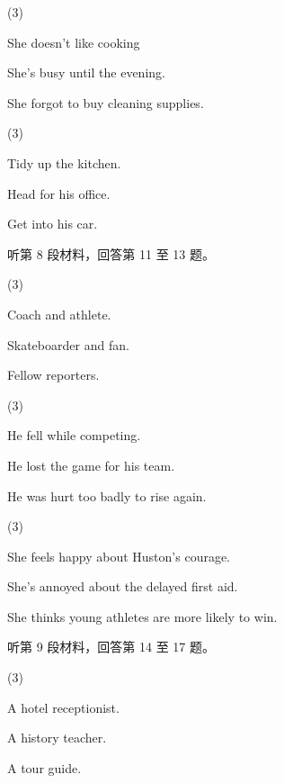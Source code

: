 \documentclass{英语试卷}
\begin{document}
\begin{choices}(3)
  \item She doesn't like cooking
  \item She's busy until the evening.
  \item She forgot to buy cleaning supplies.
\end{choices}
\begin{choices}(3)
  \item Tidy up the kitchen.
  \item Head for his office.
  \item Get into his car.
\end{choices}
\par 听第 8 段材料，回答第 11 至 13 题。\par
{}
\begin{choices}(3)
  \item Coach and athlete.
  \item Skateboarder and fan.
  \item Fellow reporters.
\end{choices}
\begin{choices}(3)
  \item He fell while competing.
  \item He lost the game for his team.
  \item He was hurt too badly to rise again.
\end{choices}
\begin{choices}(3)
  \item She feels happy about Huston's courage.
  \item She's annoyed about the delayed first aid.
  \item She thinks young athletes are more likely to win.
\end{choices}
\par 听第 9 段材料，回答第 14 至 17 题。\par
{}
\begin{choices}(3)
  \item A hotel receptionist.
  \item A history teacher.
  \item A tour guide.
\end{choices}
\end{document}
